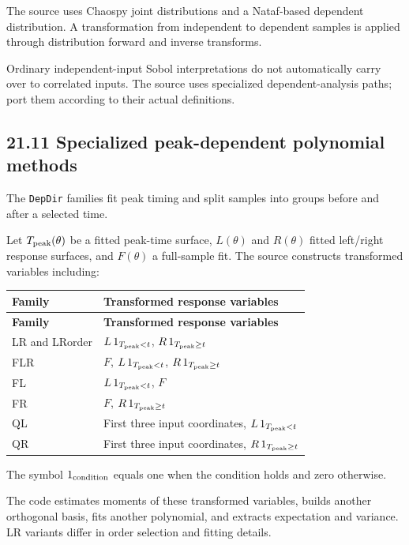 \documentclass[11pt,a4paper]{article}
\begin{document}
The source uses Chaospy joint distributions and a Nataf-based dependent distribution. A transformation from independent to dependent samples is applied through distribution forward and inverse transforms.

Ordinary independent-input Sobol interpretations do not automatically carry over to correlated inputs. The source uses specialized dependent-analysis paths; port them according to their actual definitions.

\subsection{21.11 Specialized peak-dependent polynomial methods}
The \texttt{DepDir} families fit peak timing and split samples into groups before and after a selected time.

Let \(T_{\rm peak}(\theta)\) be a fitted peak-time surface, \(L(\theta)\) and \(R(\theta)\) fitted left/right response surfaces, and \(F(\theta)\) a full-sample fit. The source constructs transformed variables including:


\begingroup\footnotesize
\setlength{\tabcolsep}{4pt}
\begin{longtable}{>{\raggedright\arraybackslash}p{}>{\raggedright\arraybackslash}p{}}
\toprule
\textbf{Family} & \textbf{Transformed response variables} \\
\midrule
\endfirsthead
\textbf{Family} & \textbf{Transformed response variables} \\
\midrule
\endhead
\bottomrule
\endfoot
LR and LRorder & \(L\,1_{T_{\rm peak}<t}\), \(R\,1_{T_{\rm peak}\geq t}\) \\
FLR & \(F\), \(L\,1_{T_{\rm peak}<t}\), \(R\,1_{T_{\rm peak}\geq t}\) \\
FL & \(L\,1_{T_{\rm peak}<t}\), \(F\) \\
FR & \(F\), \(R\,1_{T_{\rm peak}\geq t}\) \\
QL & First three input coordinates, \(L\,1_{T_{\rm peak}<t}\) \\
QR & First three input coordinates, \(R\,1_{T_{\rm peak}\geq t}\) \\
\end{longtable}
\endgroup
The symbol \(1_{\rm condition}\) equals one when the condition holds and zero otherwise.

The code estimates moments of these transformed variables, builds another orthogonal basis, fits another polynomial, and extracts expectation and variance. LR variants differ in order selection and fitting details.
\end{document}
